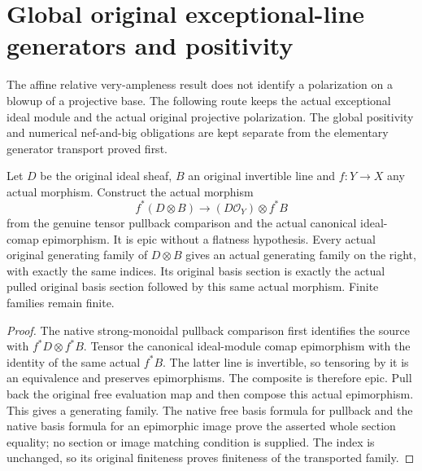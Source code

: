 \section{Global original exceptional-line generators and positivity}

The affine relative very-ampleness result does not identify a polarization
on a blowup of a projective base. The following route keeps the actual
exceptional ideal module and the actual original projective polarization.
The global positivity and numerical nef-and-big obligations are kept
separate from the elementary generator transport proved first.

\begin{lemma}
\leanok
\label{lem:kn-nadel-nef-big-comap-tensor-generators}
Let $D$ be the original ideal sheaf, $B$ an original invertible line and
$f:Y\to X$ any actual morphism. Construct the actual morphism
\[
 f^*(D\otimes B)\longrightarrow (D\mathcal O_Y)\otimes f^*B
\]
from the genuine tensor pullback comparison and the actual canonical
ideal-comap epimorphism. It is epic without a flatness hypothesis. Every
actual original generating family of $D\otimes B$ gives an actual generating
family on the right, with exactly the same indices. Its original basis
section is exactly the actual pulled original basis section followed by
this same actual morphism. Finite families remain finite.
\end{lemma}
\begin{proof}
The native strong-monoidal pullback comparison first identifies the source
with $f^*D\otimes f^*B$. Tensor the canonical ideal-module comap epimorphism
with the identity of the same actual $f^*B$. The latter line is invertible,
so tensoring by it is an equivalence and preserves epimorphisms. The
composite is therefore epic. Pull back the original free evaluation map
and then compose this actual epimorphism. This gives a generating family.
The native free basis formula for pullback and the native basis formula
for an epimorphic image prove the asserted whole section equality; no
section or image matching condition is supplied. The index is unchanged,
so its original finiteness proves finiteness of the transported family.
\end{proof}

